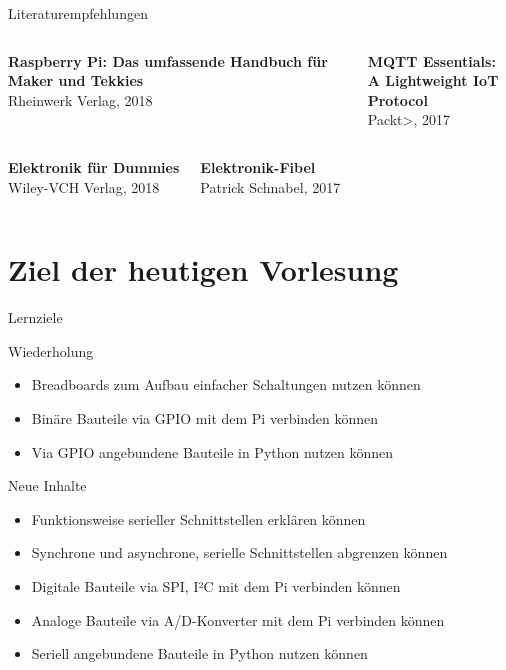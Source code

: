 {\begin{frame}{Literaturempfehlungen}
    \begin{columns}
        \textbf{Raspberry Pi: Das umfassende Handbuch für Maker und Tekkies} \\ Rheinwerk Verlag, 2018

        \textbf{MQTT Essentials: \\ A Lightweight IoT Protocol} \\ Packt>, 2017
    \end{columns}

    \vskip 0.6cm

    \begin{columns}
        \textbf{Elektronik für Dummies} \\ Wiley-VCH Verlag, 2018

        \textbf{Elektronik-Fibel} \\ Patrick Schnabel, 2017
    \end{columns}
\end{frame}
}

\section{Ziel der heutigen Vorlesung}

\begin{frame}{Lernziele}
    \begin{block}{Wiederholung}
        \begin{itemize}
            \item Breadboards zum Aufbau einfacher Schaltungen nutzen können
            \item Binäre Bauteile via GPIO mit dem Pi verbinden können
            \item Via GPIO angebundene Bauteile in Python nutzen können
        \end{itemize}
    \end{block}

    \begin{block}{Neue Inhalte}
        \begin{itemize}
            \item Funktionsweise serieller Schnittstellen erklären können
            \item Synchrone und asynchrone, serielle Schnittstellen abgrenzen können
            \item Digitale Bauteile via SPI, I²C mit dem Pi verbinden können
            \item Analoge Bauteile via A/D-Konverter mit dem Pi verbinden können
            \item Seriell angebundene Bauteile in Python nutzen können
        \end{itemize}
    \end{block}
\end{frame}

